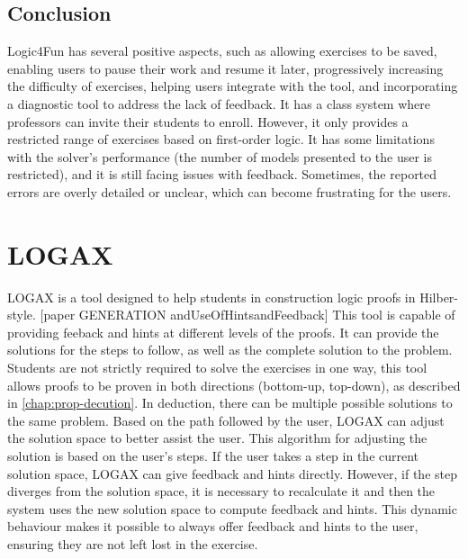 \subsection{Conclusion}
Logic4Fun has several positive aspects, such as allowing exercises to be saved, enabling users to pause their work and resume it later, progressively increasing the difficulty of exercises, helping users integrate with the tool, and incorporating a diagnostic tool to address the lack of feedback. It has a class system where professors can invite their students to enroll. However, it only provides a restricted range of exercises based on first-order logic. It has some limitations with the solver's performance (the number of models presented to the user is restricted), and it is still facing issues with feedback. Sometimes, the reported errors are overly detailed or unclear, which can become frustrating for the users.

\section{LOGAX}
LOGAX is a tool designed to help students in construction logic proofs in Hilber-style. [paper GENERATION andUseOfHintsandFeedback] This tool is capable of providing feeback and hints at different levels of the proofs. It can provide the solutions for the steps to follow, as well as the complete solution to the problem. 
Students are not strictly required to solve the exercises in one way, this tool allows proofs to be proven in both directions (bottom-up, top-down), as described in \ref{chap:prop-decution}. In deduction, there can be multiple possible solutions to the same problem. Based on the path followed by the user, LOGAX can adjust the solution space to better assist the user. This algorithm for adjusting the solution is based on the user's steps. If the user takes a step in the current solution space, LOGAX can give feedback and hints directly. However, if the step diverges from the solution space, it is necessary to recalculate it and then the system uses the new solution space to compute feedback and hints. This dynamic behaviour makes it possible to always offer feedback and hints to the user, ensuring they are not left lost in the exercise. 


